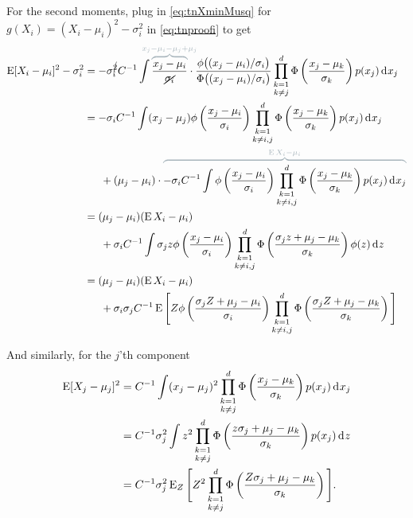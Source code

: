 For the second moments, plug in \cref{eq:tnXminMusq} for $g(X_i)= (X_i - \mu_i)^2 - \sigma_i^2$ in \cref{eq:tnproofi} to get
\begin{align*}
  \E [X_i - \mu_i]^2 - \sigma_i^2
  &= - \sigma_i^{\cancel{2}} C^{-1} \int   
  \myoverbrace{\frac{x_j - \mu_i}{\cancel{\sigma_i}}}{\hidewidth x_j - \mu_i - \mu_j + \mu_j \hidewidth} \cdot
  \frac{\phi\big( (x_j - \mu_i) / \sigma_i \big)}{\Phi\big( (x_j - \mu_i) / \sigma_i \big)}
  \mathop{\prod_{k=1}^d}_{k \neq j} \Phi \left( \frac{x_j - \mu_k}{\sigma_k} \right)  p(x_j) \dint x_j \\
  &= - \sigma_i C^{-1} \int  
  (x_j - \mu_j)
  \phi \left( \frac{x_j-\mu_i}{\sigma_i} \right)
  \mathop{\prod_{k=1}^d}_{k \neq i,j} \Phi \left( \frac{x_j - \mu_k}{\sigma_k} \right)  p(x_j) \dint x_j \\
  &\phantom{==} +  (\mu_j-\mu_i)  \cdot 
  \myoverbrace{-\sigma_i C^{-1} \int  
  \phi \left( \frac{x_j-\mu_i}{\sigma_i} \right)
  \mathop{\prod_{k=1}^d}_{k \neq i,j} \Phi \left( \frac{x_j - \mu_k}{\sigma_k} \right)  p(x_j) \dint x_j}{\E X_i - \mu_i} \\
  &= (\mu_j-\mu_i)(\E X_i - \mu_i)  \\
  &\phantom{==}
  + \sigma_i C^{-1} \int  \sigma_j z 
  \phi \left( \frac{x_j-\mu_i}{\sigma_i} \right)
  \mathop{\prod_{k=1}^d}_{k \neq i,j} \Phi \left( \frac{\sigma_j z + \mu_j - \mu_k}{\sigma_k} \right)  \phi(z) \dint z \\
  &= (\mu_j-\mu_i)(\E X_i - \mu_i) \\
  &\phantom{==} + \sigma_i\sigma_j C^{-1} 
  \E \Bigg[
  Z \phi \left( \frac{\sigma_j Z + \mu_j -\mu_i}{\sigma_i} \right) 
  \mathop{\prod_{k=1}^d}_{k \neq i,j} \Phi \left( \frac{\sigma_j Z + \mu_j - \mu_k}{\sigma_k} \right) 
  \Bigg]
\end{align*}

And similarly, for the $j$'th component
\begin{align*}
  \operatorname{E} [X_j - \mu_j]^2
  &= C^{-1} \int (x_j - \mu_j)^2  \mathop{\prod_{k=1}^d}_{k \neq j} \Phi \left( \frac{x_j - \mu_k}{\sigma_k} \right) p(x_j) \operatorname{d}\hspace{0.5pt}\! x_j \\
   &= C^{-1} \sigma_j^2 \int z^2  \mathop{\prod_{k=1}^d}_{k \neq j} \Phi \left( \frac{z\sigma_j + \mu_j - \mu_k}{\sigma_k} \right) p(x_j) \operatorname{d}\hspace{0.5pt}\! z \\
   &= C^{-1} \sigma_j^2 
   \operatorname{E}_Z \Bigg[ Z^2  \mathop{\prod_{k=1}^d}_{k \neq j} \Phi \left( \frac{Z\sigma_j + \mu_j - \mu_k}{\sigma_k} \right) \Bigg].
\end{align*}

